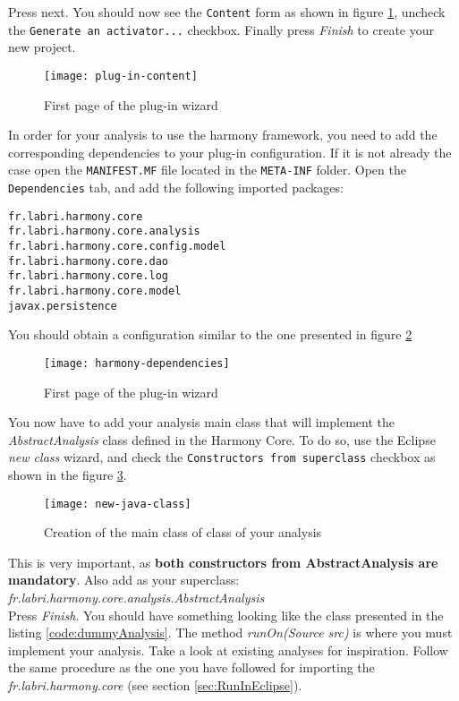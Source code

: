 Press next. You should now see the \texttt{Content} form as shown in figure \ref{fig:plug-in-content}, uncheck the \texttt{Generate an activator...} checkbox. Finally press \emph{Finish} to create your new project.

	\begin{figure}[H]
		\centering
		\texttt{[image: plug-in-content]}
		\caption{First page of the plug-in wizard}
		\label{fig:plug-in-content}
	\end{figure}

In order for your analysis to use the harmony framework, you need to add the corresponding dependencies to your plug-in configuration. If it is not already the case open the \texttt{MANIFEST.MF} file located in the \texttt{META-INF} folder. Open the \texttt{Dependencies} tab, and add the following imported packages:

\begin{lstlisting}
fr.labri.harmony.core
fr.labri.harmony.core.analysis
fr.labri.harmony.core.config.model
fr.labri.harmony.core.dao
fr.labri.harmony.core.log
fr.labri.harmony.core.model
javax.persistence
\end{lstlisting}

You should obtain a configuration similar to the one presented in figure \ref{fig:harmony-dependencies}

	\begin{figure}[H]
		\centering
		\texttt{[image: harmony-dependencies]}
		\caption{First page of the plug-in wizard}
		\label{fig:harmony-dependencies}
	\end{figure}

You now have to add your analysis main class that will implement the \emph{AbstractAnalysis} class defined in the Harmony Core. To do so, use the Eclipse \emph{new class} wizard, and check the \texttt{Constructors from superclass} checkbox as shown in the figure \ref{fig:new-java-class}. 

	\begin{figure}[H]
		\centering
		\texttt{[image: new-java-class]}
		\caption{Creation of the main class of class of your analysis}
		\label{fig:new-java-class}
	\end{figure}

This is very important, as \textbf{both constructors from AbstractAnalysis are mandatory}. Also add as your superclass: \\ \emph{fr.labri.harmony.core.analysis.AbstractAnalysis}\\
Press \emph{Finish}. You should have something looking like the class presented in the listing \ref{code:dummyAnalysis}. The method \emph{runOn(Source src)} is where you must implement your analysis. Take a look at existing analyses for inspiration. Follow the same procedure as the one you have followed for importing the \emph{fr.labri.harmony.core} (see section \ref{sec:RunInEclipse}).

